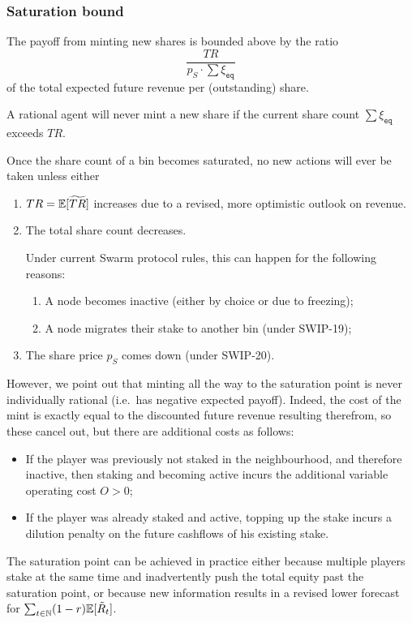 \subsubsection{Saturation bound}
The payoff from minting new shares is bounded above by the ratio
\[
  \frac{TR}{p_S\cdot\sum \xi_\mathtt{eq}}
\]
of the total expected future revenue per (outstanding) share.

\begin{proposition*}

  A rational agent will never mint a new share if the current share count $\sum \xi_\mathtt{eq}$ exceeds $TR$.

\end{proposition*}

Once the share count of a bin becomes saturated, no new actions will ever be taken unless either
\begin{enumerate}
  \item $TR=\mathbb{E}[\widetilde{TR}]$ increases due to a revised, more optimistic outlook on revenue.
  \item The total share count decreases. 
  
    Under current Swarm protocol rules, this can happen for the following reasons:
  \begin{enumerate}
    \item A node becomes inactive (either by choice or due to freezing);
    \item A node migrates their stake to another bin (under SWIP-19);
  \end{enumerate}
  \item The share price $p_S$ comes down (under SWIP-20).
\end{enumerate}

However, we point out that minting all the way to the saturation point is never individually rational (i.e.~has negative expected payoff).
%
Indeed, the cost of the mint is exactly equal to the discounted future revenue resulting therefrom, so these cancel out, but there are additional costs as follows:
\begin{itemize}
  \item If the player was previously not staked in the neighbourhood, and therefore inactive, then staking and becoming active incurs the additional variable operating cost $O>0$;
  \item If the player was already staked and active, topping up the stake incurs a dilution penalty on the future cashflows of his existing stake.
\end{itemize}
%
The saturation point can be achieved in practice either because multiple players stake at the same time and inadvertently push the total equity past the saturation point, or because new information results in a revised lower forecast for $\sum_{t\in\mathbb{N}}(1-r)\mathbb{E}[\tilde R_t]$.

